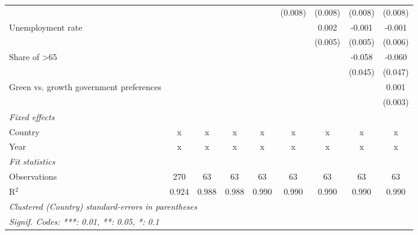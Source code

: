 \begin{table}[htbp]
\begin{tabular}{lcccccccc}
                                                              &         &         &         &               & (0.008)       & (0.008)       & (0.008)       & (0.008)\\   
      Unemployment rate                                       &         &         &         &               &               & 0.002         & -0.001        & -0.001\\   
                                                              &         &         &         &               &               & (0.005)       & (0.005)       & (0.006)\\   
      Share of >65                                            &         &         &         &               &               &               & -0.058        & -0.060\\   
                                                              &         &         &         &               &               &               & (0.045)       & (0.047)\\   
      Green vs. growth government preferences                 &         &         &         &               &               &               &               & 0.001\\   
                                                              &         &         &         &               &               &               &               & (0.003)\\   
      \emph{Fixed effects}\\
      Country                                                 & x       & x       & x       & x             & x             & x             & x             & x\\  
      Year                                                    & x       & x       & x       & x             & x             & x             & x             & x\\  
      \midrule \emph{Fit statistics}\\
      Observations                                            & 270     & 63      & 63      & 63            & 63            & 63            & 63            & 63\\  
      R$^2$                                                   & 0.924   & 0.988   & 0.988   & 0.990         & 0.990         & 0.990         & 0.990         & 0.990\\  
      \midrule
      \multicolumn{9}{l}{\emph{Clustered (Country) standard-errors in parentheses}}\\
      \multicolumn{9}{l}{\emph{Signif. Codes: ***: 0.01, **: 0.05, *: 0.1}}\\
   \end{tabular}
\end{table}


